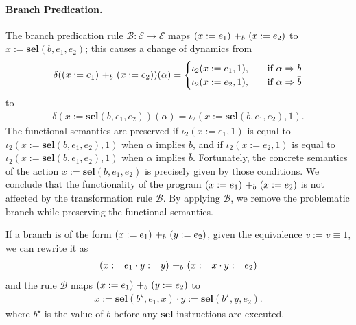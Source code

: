 \paragraph{Branch Predication.} The branch predication rule $\mathscr{B}\colon \mathscr{E}\rightarrow \mathscr{E}$ maps $\branch{b}{(x:=e_1)}{(x:=e_2)}$ to $x:=\textbf{sel}(b,e_1,e_2)$; this causes a change of dynamics from
\begin{align*}
    \delta(\branch{b}{(x:=e_1)}{(x:=e_2)})(\alpha)=
    \begin{cases}
        \iota_2(x:=e_1,1),&\quad\text{if $\alpha \Rightarrow b$}\\
        \iota_2(x:=e_2,1),&\quad\text{if $\alpha \Rightarrow \bar{b}$}\\
    \end{cases}
\end{align*}
to
\begin{align*}
    \delta(x:=\textbf{sel}(b,e_1,e_2))(\alpha)=\iota_2(x:=\textbf{sel}(b,e_1,e_2),1).
\end{align*}
The functional semantics are preserved if $\iota_2(x:=e_1,1)$ is equal to $\iota_2(x:=\textbf{sel}(b,e_1,e_2),1)$ when $\alpha$ implies $b$, and if $\iota_2(x:=e_2,1)$ is equal to $\iota_2(x:=\textbf{sel}(b,e_1,e_2),1)$ when $\alpha$ implies $\bar{b}$. 
Fortunately, the concrete semantics of the action $x:=\textbf{sel}(b,e_1,e_2)$ is precisely given by those conditions. We conclude that the functionality of the program $\branch{b}{(x:=e_1)}{(x:=e_2)}$ is not affected by the transformation rule $\mathscr{B}$. By applying $\mathscr{B}$, we remove the problematic branch while preserving the functional semantics.

If a branch is of the form $\branch{b}{(x:=e_1)}{(y:=e_2)}$, given the equivalence $v:=v\equiv 1$, we can rewrite it as 
\begin{align*}
    \branch{b}{(x:=e_1\cdot y:=y)}{(x:=x\cdot y:=e_2)}
\end{align*}
and the rule $\mathscr{B}$ maps $\branch{b}{(x:=e_1)}{(y:=e_2)}$ to 
\begin{align}
    x:=\textbf{sel}(b^\star,e_1,x)\cdot y:=\textbf{sel}(b^\star,y,e_2).
\end{align}
where $b^\star$ is the value of $b$ before any $\textbf{sel}$ instructions are executed.

